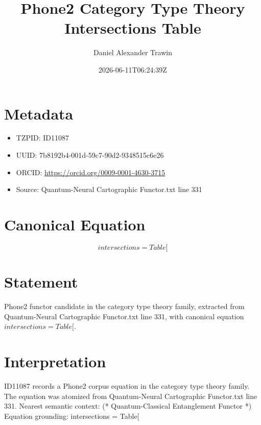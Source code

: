 \documentclass[11pt]{article}
\title{Phone2 Category Type Theory Intersections Table}
\author{Daniel Alexander Trawin}
\date{2026-06-11T06:24:39Z}
\begin{document}
\maketitle
\section*{Metadata}
\begin{itemize}
\item TZPID: ID11087
\item UUID: 7b8192b4-001d-59c7-90d2-9348515c6e26
\item ORCID: \url{https://orcid.org/0009-0001-4630-3715}
\item Source: Quantum-Neural Cartographic Functor.txt line 331
\end{itemize}
\section*{Canonical Equation}
\[
intersections = Table[
\]
\section*{Statement}
Phone2 functor candidate in the category type theory family, extracted from Quantum-Neural Cartographic Functor.txt line 331, with canonical equation $intersections = Table[$.
\section*{Interpretation}
ID11087 records a Phone2 corpus equation in the category type theory family. The equation was atomized from Quantum-Neural Cartographic Functor.txt line 331. Nearest semantic context: (* Quantum-Classical Entanglement Functor *) Equation grounding: intersections = Table[
\end{document}
